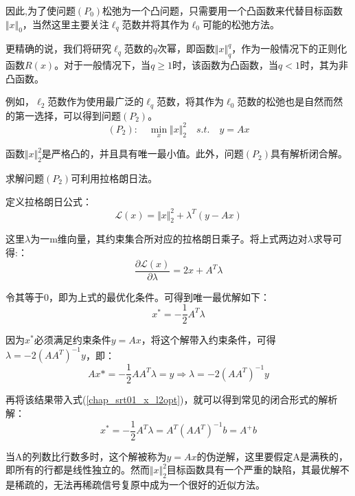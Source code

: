 因此,为了使问题$ (P_0) $松弛为一个凸问题，只需要用一个凸函数来代替目标函数$\Vert x \Vert_0  $，当然这里主要关注$ \ell_q $范数并将其作为$ \ell_0 $可能的松弛方法。

更精确的说，我们将研究$ \ell_q $范数的$ q $次幂，即函数$ \Vert x\Vert_q^q $，作为一般情况下的正则化函数$ R(x) $。对于一般情况下，当$ q\geq 1 $时，该函数为凸函数，当$ q<1 $时，其为非凸函数。


{\heiti 例如，$ \ell_2 $范数作为使用最广泛的$ \ell_q $范数，将其作为$ \ell_0 $范数的松弛也是自然而然的第一选择，可以得到问题$ (P_2) $}。
\begin{equation}\label{key}
(P_2):\quad  \min_{x} \Vert x \Vert_2^2 \quad s.t. \quad y =Ax
\end{equation}

函数$ \Vert x\Vert_2^2 $是严格凸的，并且具有唯一最小值。此外，问题$ (P_2) $具有解析闭合解。

{\heiti 求解问题$ (P_2) $可利用拉格朗日法。}

定义拉格朗日公式：
\begin{equation*}%
\mathcal{L}(x)= \Vert x \Vert_2^2 + \lambda^{T}(y-Ax)
\end{equation*}

这里$\lambda$为一m维向量，其约束集合所对应的拉格朗日乘子。将上式两边对$ \lambda $求导可得:：
\begin{equation*}\label{key}
\frac{\partial \mathcal{L}(x)}{\partial\lambda}= 2 x  +A^{T}\lambda 
\end{equation*}

令其等于0，即为上式的最优化条件。可得到唯一最优解如下：
\begin{equation*}\label{chap_srt01_x_l2opt}
x^*= -\frac{1}{2} A^T \lambda
\end{equation*}

因为$ x^* $必须满足约束条件$y= Ax$，将这个解带入约束条件，可得$ \lambda = -2(AA^T)^{-1}y $，即：
\begin{equation*}\label{key}
Ax* = -\frac{1}{2} A A^T \lambda = y  \Longrightarrow
\lambda = -2(AA^T)^{-1}y 
\end{equation*}

再将该结果带入式(\ref{chap_srt01_x_l2opt})，就可以得到常见的闭合形式的解析解：
\begin{equation*}\label{key}
x^* = -\frac{1}{2} A^T \lambda = A^{T}(AA^T)^{-1}b  = A^{+}b
\end{equation*}

当A的列数比行数多时，这个解被称为$ y=Ax $的伪逆解，这里要假定A是满秩的，即所有的行都是线性独立的。然而$\Vert x\Vert_2^2  $目标函数具有一个严重的缺陷，其最优解不是稀疏的，无法再稀疏信号复原中成为一个很好的近似方法。


